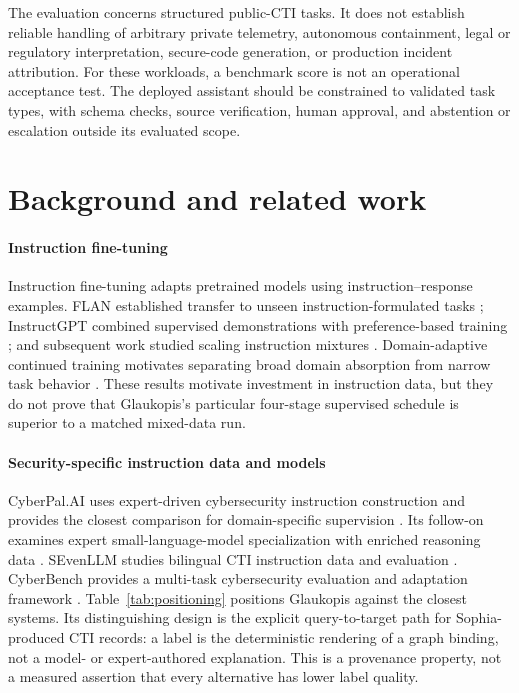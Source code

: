 \documentclass[twocolumn]{svjour3}
\begin{document}
The evaluation concerns structured public-CTI tasks. It does not establish reliable handling of arbitrary private telemetry, autonomous containment, legal or regulatory interpretation, secure-code generation, or production incident attribution. For these workloads, a benchmark score is not an operational acceptance test. The deployed assistant should be constrained to validated task types, with schema checks, source verification, human approval, and abstention or escalation outside its evaluated scope.

\section{Background and related work}\label{sec:related}
\paragraph{Instruction fine-tuning}
Instruction fine-tuning adapts pretrained models using instruction--response examples. FLAN established transfer to unseen instruction-formulated tasks \cite{wei2022flan}; InstructGPT combined supervised demonstrations with preference-based training \cite{ouyang2022instructgpt}; and subsequent work studied scaling instruction mixtures \cite{chung2024flant5}. Domain-adaptive continued training motivates separating broad domain absorption from narrow task behavior \cite{gururangan2020dontstop}. These results motivate investment in instruction data, but they do not prove that Glaukopis's particular four-stage supervised schedule is superior to a matched mixed-data run.

\paragraph{Security-specific instruction data and models}
CyberPal.AI uses expert-driven cybersecurity instruction construction and provides the closest comparison for domain-specific supervision \cite{levi2025cyberpal}. Its follow-on examines expert small-language-model specialization with enriched reasoning data \cite{levi2025toward}. SEvenLLM studies bilingual CTI instruction data and evaluation \cite{ji2024sevenllm}. CyberBench provides a multi-task cybersecurity evaluation and adaptation framework \cite{liu2024cyberbench}. Table~\ref{tab:positioning} positions Glaukopis against the closest systems. Its distinguishing design is the explicit query-to-target path for Sophia-produced CTI records: a label is the deterministic rendering of a graph binding, not a model- or expert-authored explanation. This is a provenance property, not a measured assertion that every alternative has lower label quality.
\end{document}
